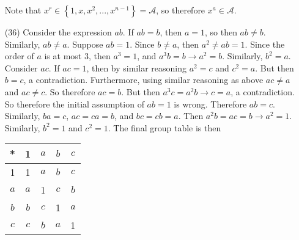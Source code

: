\documentclass[12pt]{article}
\begin{document}
\begin{itemize}
Note that $x^r \in \left\lbrace 1, x, x^2, ..., x^{n - 1} \right\rbrace = \mathcal{A}$, so therefore $x^a \in \mathcal{A}$.
\item[(36)]
Consider the expression $ab$. If $ab = b$, then $a = 1$, so then $ab \neq b$. Similarly, $ab \neq a$. Suppose $ab = 1$. Since $b \neq a$, then $a^2 \neq ab = 1$. Since the order of $a$ is at most 3, then $a^3 = 1$, and $a^3b = b \rightarrow a^2 = b$. Similarly, $b^2 = a$. Consider $ac$. If $ac = 1$, then by similar reasoning $a^2 = c$ and $c^2 = a$. But then $b = c$, a contradiction. Furthermore, using similar reasoning as above $ac \neq a$ and $ac \neq c$. So therefore $ac = b$. But then $a^3c = a^2b \rightarrow c = a$, a contradiction. So therefore the initial assumption of $ab = 1$ is wrong. Therefore $ab = c$. Similarly, $ba = c$, $ac = ca = b$, and $bc = cb = a$. Then $a^2b = ac = b \rightarrow a^2 = 1$. Similarly, $b^2 = 1$ and $c^2 = 1$. The final group table is then \\
\begin{center}
\begin{tabular}{| c || c | c | c | c |}
\hline
* & 1 & $a$ & $b$ & $c$ \\
\hline
\hline
1 & 1 & $a$ & $b$ & $c$ \\
\hline
$a$ & $a$ & 1 & $c$ & $b$ \\
\hline
$b$ & $b$ & $c$ & 1 & $a$ \\
\hline
$c$ & $c$ & $b$ & $a$ & 1 \\
\hline
\end{tabular}
\end{center}
\end{itemize}
\end{document}

